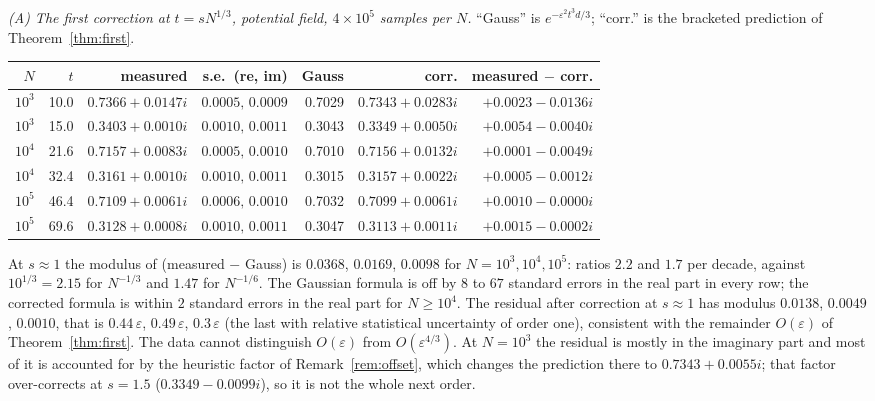 \documentclass[11pt]{article}
\newcommand{\eps}{\varepsilon}
\theoremstyle{remark}
\begin{document}
\emph{(A) The first correction at $t = sN^{1/3}$, potential field,
$4\times10^5$ samples per $N$.} ``Gauss'' is $e^{-\eps^2t^3d/3}$; ``corr.''
is the bracketed prediction of Theorem~\ref{thm:first}.
\begin{center}
\small
\begin{tabular}{rrrrrrr}
  $N$ & $t$ & measured & s.e.\ (re, im) & Gauss & corr. & measured $-$ corr. \\ \hline
  $10^3$ & 10.0 & $0.7366+0.0147i$ & $0.0005,\,0.0009$ & 0.7029 & $0.7343+0.0283i$ & $+0.0023-0.0136i$ \\
  $10^3$ & 15.0 & $0.3403+0.0010i$ & $0.0010,\,0.0011$ & 0.3043 & $0.3349+0.0050i$ & $+0.0054-0.0040i$ \\
  $10^4$ & 21.6 & $0.7157+0.0083i$ & $0.0005,\,0.0010$ & 0.7010 & $0.7156+0.0132i$ & $+0.0001-0.0049i$ \\
  $10^4$ & 32.4 & $0.3161+0.0010i$ & $0.0010,\,0.0011$ & 0.3015 & $0.3157+0.0022i$ & $+0.0005-0.0012i$ \\
  $10^5$ & 46.4 & $0.7109+0.0061i$ & $0.0006,\,0.0010$ & 0.7032 & $0.7099+0.0061i$ & $+0.0010-0.0000i$ \\
  $10^5$ & 69.6 & $0.3128+0.0008i$ & $0.0010,\,0.0011$ & 0.3047 & $0.3113+0.0011i$ & $+0.0015-0.0002i$ \\
\end{tabular}
\end{center}
At $s\approx1$ the modulus of (measured $-$ Gauss) is $0.0368$, $0.0169$,
$0.0098$ for $N = 10^3,10^4,10^5$: ratios $2.2$ and $1.7$ per decade, against
$10^{1/3} = 2.15$ for $N^{-1/3}$ and $1.47$ for $N^{-1/6}$. The Gaussian
formula is off by $8$ to $67$ standard errors in the real part in every row;
the corrected formula is within $2$ standard errors in the real part for
$N\ge10^4$. The residual after correction at $s\approx1$ has modulus
$0.0138$, $0.0049$, $0.0010$, that is $0.44\,\eps$, $0.49\,\eps$,
$0.3\,\eps$ (the last with relative statistical uncertainty of order one),
consistent with the remainder $O(\eps)$ of Theorem~\ref{thm:first}. The data
cannot distinguish $O(\eps)$ from $O(\eps^{4/3})$. At $N=10^3$ the residual
is mostly in the imaginary part and most of it is accounted for by the
heuristic factor of Remark~\ref{rem:offset}, which changes the prediction
there to $0.7343+0.0055i$; that factor over-corrects at $s=1.5$
($0.3349-0.0099i$), so it is not the whole next order.
\end{document}
